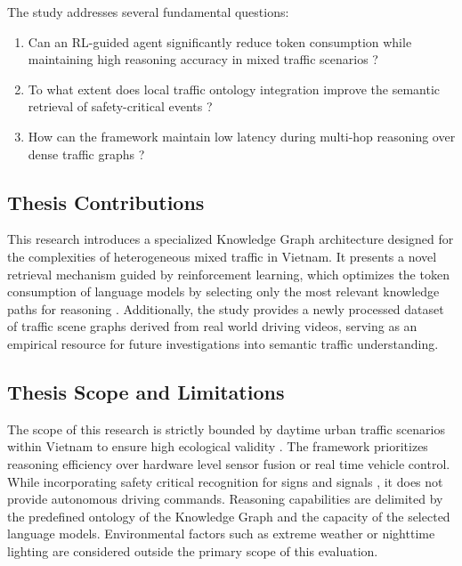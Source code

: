 \documentclass[a4paper, 12pt]{article}
\begin{document}
	The study addresses several fundamental questions:
	\begin{enumerate}
		\item Can an RL-guided agent significantly reduce token consumption while maintaining high reasoning accuracy in mixed traffic scenarios \cite{jiang2024graphllm}?
		\item To what extent does local traffic ontology integration improve the semantic retrieval of safety-critical events \cite{wei2022cot}?
		\item How can the framework maintain low latency during multi-hop reasoning over dense traffic graphs \cite{song2025plan, zhang2026recursive}?
	\end{enumerate}
	
	\subsection{Thesis Contributions}
	This research introduces a specialized Knowledge Graph architecture designed for the complexities of heterogeneous mixed traffic in Vietnam. It presents a novel retrieval mechanism guided by reinforcement learning, which optimizes the token consumption of language models by selecting only the most relevant knowledge paths for reasoning \cite{song2025plan, chen2025pathrag}. Additionally, the study provides a newly processed dataset of traffic scene graphs derived from real world driving videos, serving as an empirical resource for future investigations into semantic traffic understanding.
	
	\subsection{Thesis Scope and Limitations}
	The scope of this research is strictly bounded by daytime urban traffic scenarios within Vietnam to ensure high ecological validity \cite{vo2021density, ly2025enhancing}. The framework prioritizes reasoning efficiency over hardware level sensor fusion or real time vehicle control. While incorporating safety critical recognition for signs and signals \cite{schmidt2025tls}, it does not provide autonomous driving commands. Reasoning capabilities are delimited by the predefined ontology of the Knowledge Graph and the capacity of the selected language models. Environmental factors such as extreme weather or nighttime lighting are considered outside the primary scope of this evaluation.
	
\end{document}

